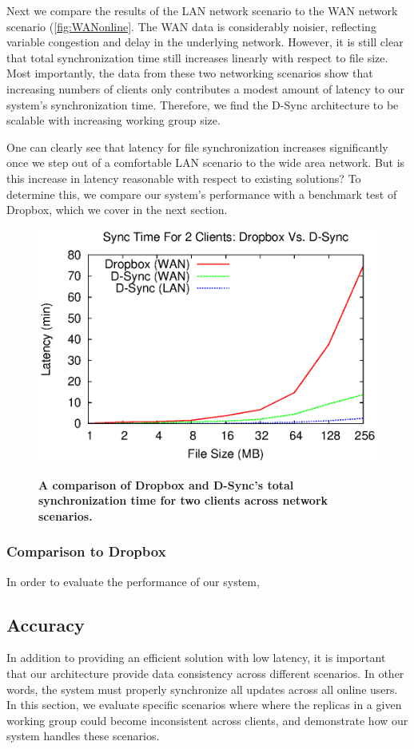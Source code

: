 Next we compare the results of the LAN network scenario to the WAN network scenario (\ref{fig:WANonline}.
The WAN data is considerably noisier,
reflecting variable congestion and delay in the underlying network.
However, it is still clear that total synchronization time still increases
linearly with respect to file size.
Most importantly, the data from these two networking scenarios show
that increasing numbers of clients only contributes a modest
amount of latency to our system's synchronization time.
Therefore, we find the D-Sync architecture to be scalable 
with increasing working group size.

One can clearly see that latency for file synchronization
increases significantly once we step out of a comfortable LAN
scenario to the wide area network.
But is this increase in latency reasonable with respect to existing solutions?
To determine this, we compare our system's performance with a
benchmark test of Dropbox, which we cover in the next section.

\begin{figure}[h]
    \centering
    \includegraphics[scale=0.5]{figs/Dropbox_Performance.eps}
    \label{fig:dropbox}
    \caption{\textbf{A comparison of Dropbox and D-Sync's total synchronization time for two clients across network scenarios.}}
\end{figure}

\subsubsection{Comparison to Dropbox}
In order to evaluate the performance of our system,


\subsection{Accuracy}
\label{evaluation.accuracy}
In addition to providing an efficient solution with low latency,
it is important that our architecture provide data consistency across different
scenarios.
In other words, the system must properly synchronize
all updates across all online users.
In this section, we evaluate specific scenarios where
where the replicas in a given working group could become inconsistent across clients,
and demonstrate how our system handles these scenarios.

